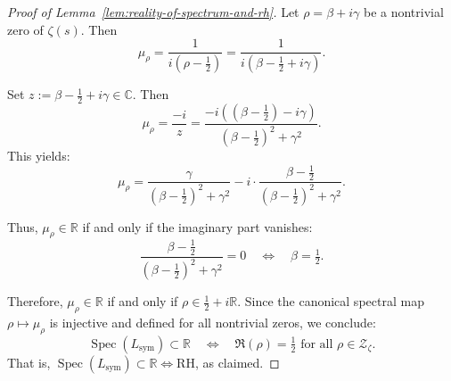 \begin{proof}[Proof of Lemma~\ref{lem:reality-of-spectrum-and-rh}]
Let \( \rho = \beta + i\gamma \) be a nontrivial zero of \( \zeta(s) \). Then
\[
\mu_\rho = \frac{1}{i(\rho - \tfrac{1}{2})} = \frac{1}{i(\beta - \tfrac{1}{2} + i\gamma)}.
\]

Set \( z := \beta - \tfrac{1}{2} + i\gamma \in \mathbb{C} \). Then
\[
\mu_\rho = \frac{-i}{z} = \frac{-i((\beta - \tfrac{1}{2}) - i\gamma)}{(\beta - \tfrac{1}{2})^2 + \gamma^2}.
\]
This yields:
\[
\mu_\rho = \frac{\gamma}{(\beta - \tfrac{1}{2})^2 + \gamma^2} - i \cdot \frac{\beta - \tfrac{1}{2}}{(\beta - \tfrac{1}{2})^2 + \gamma^2}.
\]

Thus, \( \mu_\rho \in \mathbb{R} \) if and only if the imaginary part vanishes:
\[
\frac{\beta - \tfrac{1}{2}}{(\beta - \tfrac{1}{2})^2 + \gamma^2} = 0 \quad \Longleftrightarrow \quad \beta = \tfrac{1}{2}.
\]

Therefore, \( \mu_\rho \in \mathbb{R} \) if and only if \( \rho \in \tfrac{1}{2} + i\mathbb{R} \). Since the canonical spectral map \( \rho \mapsto \mu_\rho \) is injective and defined for all nontrivial zeros, we conclude:
\[
\operatorname{Spec}(L_{\mathrm{sym}}) \subset \mathbb{R}
\quad \iff \quad
\Re(\rho) = \tfrac{1}{2} \text{ for all } \rho \in \mathcal{Z}_\zeta.
\]
That is, \( \operatorname{Spec}(L_{\mathrm{sym}}) \subset \mathbb{R} \iff \mathrm{RH} \), as claimed.
\end{proof}
% 